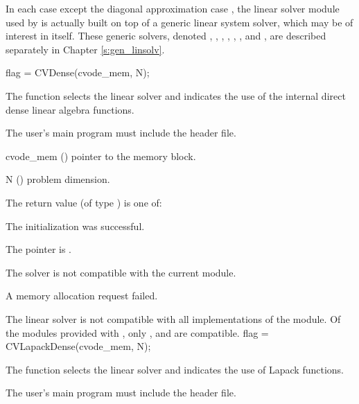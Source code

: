 In each case except the diagonal approximation case {\cvdiag},
the linear solver module used by {\cvode} is actually built on top of a generic
linear system solver, which may be of interest in itself.  These generic solvers,
denoted {\dense}, {\band}, {\klu}, {\superlumt}, {\spgmr}, {\spbcg}, and {\sptfqmr},
are described separately in Chapter \ref{s:gen_linsolv}.

{
  flag = CVDense(cvode\_mem, N);
}
{
  The function  selects the {\cvdense} linear solver and indicates
  the use of the internal direct dense linear algebra functions.

  The user's main program must include the  header file.
}
{
  \begin{args}
  \item[cvode\_mem] ()
    pointer to the {\cvode} memory block.
  \item[N] ()
    problem dimension.
  \end{args}
}
{
  The return value  (of type ) is one of:
  \begin{args}
  \item[\Id{CVDLS\_SUCCESS}] 
    The {\cvdense} initialization was successful.
  \item[\Id{CVDLS\_MEM\_NULL}]
    The  pointer is .
  \item[\Id{CVDLS\_ILL\_INPUT}]
    The {\cvdense} solver is not compatible with the current {\nvector} module.
  \item[\Id{CVDLS\_MEM\_FAIL}]
    A memory allocation request failed.
  \end{args}
}
{
  The {\cvdense} linear solver is not compatible with all
  implementations of the {\nvector} module. 
  Of the {\nvector} modules provided with {\sundials}, only {\nvecs},
  {\nvecopenmp} and {\nvecpthreads} are compatible.
}
{
  flag = CVLapackDense(cvode\_mem, N);
}
{
  The function  selects the {\cvdense} linear solver and 
  indicates the use of Lapack functions. 

  The user's main program must include the  header file.
}
